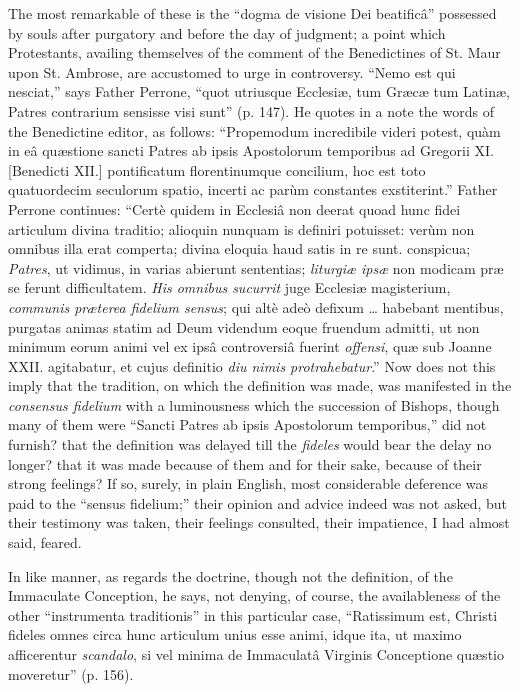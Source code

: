 The most remarkable of these is the ``dogma de
visione Dei beatificâ'' possessed by souls after purgatory and before
the day of judgment; a point which Protestants, availing themselves of
the comment of the Benedictines of St. Maur upon St. Ambrose, are
accustomed to urge in controversy. ``Nemo est qui nesciat,'' says Father
Perrone, ``quot utriusque Ecclesiæ, tum Græcæ tum Latinæ, Patres
contrarium sensisse visi sunt'' (p. 147). He quotes in a note the words
of the Benedictine editor, as follows: ``Propemodum incredibile videri
potest, quàm in eâ quæstione sancti Patres ab ipsis Apostolorum
temporibus ad Gregorii XI. [Benedicti XII.] pontificatum florentinumque
concilium, hoc est toto quatuordecim seculorum spatio, incerti ac parùm
constantes exstiterint.'' Father Perrone continues: ``Certè quidem in
Ecclesiâ non deerat quoad hunc fidei articulum divina traditio;
alioquin nunquam is definiri potuisset: verùm non omnibus illa erat
comperta; divina eloquia haud satis in re sunt. conspicua; \emph{Patres},
ut vidimus, in varias abierunt sententias; \emph{liturgiæ ipsæ} non
modicam præ se ferunt difficultatem. \emph{His omnibus sucurrit} juge
Ecclesiæ magisterium, \emph{communis præterea fidelium sensus}; qui
altè adeò defixum … habebant mentibus, purgatas animas statim ad
Deum videndum eoque fruendum admitti, ut non minimum eorum animi vel ex
ipsâ controversiâ fuerint \emph{offensi}, quæ sub Joanne XXII.
agitabatur, et cujus definitio \emph{diu nimis protrahebatur}.'' Now does
not this imply that the tradition, on which the definition was made, was
manifested in the \emph{consensus fidelium} with a luminousness which
the succession of Bishops, though many of them were ``Sancti Patres ab
ipsis Apostolorum temporibus,'' did not furnish? that the definition was
delayed till the \emph{fideles} would bear the delay no longer? that it
was made because of them and for their sake, because of their strong
feelings? If so, surely, in plain English, most considerable deference
was paid to the ``sensus fidelium;'' their opinion and advice indeed was
not asked, but their testimony was taken, their feelings consulted,
their impatience, I had almost said, feared.

In like manner, as regards the doctrine, though not
the definition, of the Immaculate Conception, he says, not denying, of
course, the availableness of the other ``instrumenta traditionis'' in this
particular case, ``Ratissimum est, Christi fideles omnes circa hunc
articulum unius esse animi, idque ita, ut maximo afficerentur \emph{scandalo},
si vel minima de Immaculatâ Virginis Conceptione quæstio
moveretur'' (p. 156).

